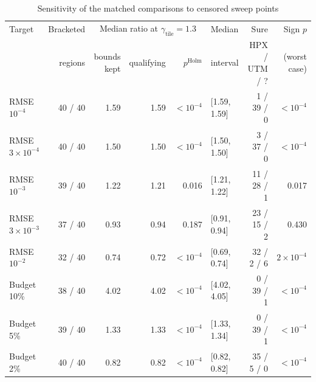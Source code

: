\begin{table}[t]
\centering
\caption{Sensitivity of the matched comparisons to censored sweep points}
\label{tab:censoring}
\footnotesize
\begin{tabular}{@{}lrrrrlrr@{}}
\toprule
Target & Bracketed & \multicolumn{3}{c}{Median ratio at $\gamma_{\mathrm{tile}}{=}1.3$} & Median & Sure & Sign $p$ \\
\cmidrule(lr){3-5}
 & regions & bounds kept & qualifying & $p^{\mathrm{Holm}}$ & interval & HPX / UTM / ? & (worst case) \\
\midrule
RMSE $10^{-4}$ & 40 / 40 & 1.59 & 1.59 & $<10^{-4}$ & [1.59, 1.59] & 1 / 39 / 0 & $<10^{-4}$ \\
RMSE $3\times10^{-4}$ & 40 / 40 & 1.50 & 1.50 & $<10^{-4}$ & [1.50, 1.50] & 3 / 37 / 0 & $<10^{-4}$ \\
RMSE $10^{-3}$ & 39 / 40 & 1.22 & 1.21 & 0.016 & [1.21, 1.22] & 11 / 28 / 1 & 0.017 \\
RMSE $3\times10^{-3}$ & 37 / 40 & 0.93 & 0.94 & 0.187 & [0.91, 0.94] & 23 / 15 / 2 & 0.430 \\
RMSE $10^{-2}$ & 32 / 40 & 0.74 & 0.72 & $<10^{-4}$ & [0.69, 0.74] & 32 / 2 / 6 & $2\times10^{-4}$ \\
Budget 10\% & 38 / 40 & 4.02 & 4.02 & $<10^{-4}$ & [4.02, 4.05] & 0 / 39 / 1 & $<10^{-4}$ \\
Budget 5\% & 39 / 40 & 1.33 & 1.33 & $<10^{-4}$ & [1.33, 1.34] & 0 / 39 / 1 & $<10^{-4}$ \\
Budget 2\% & 40 / 40 & 0.82 & 0.82 & $<10^{-4}$ & [0.82, 0.82] & 35 / 5 / 0 & $<10^{-4}$ \\
\bottomrule
\end{tabular}
\end{table}
